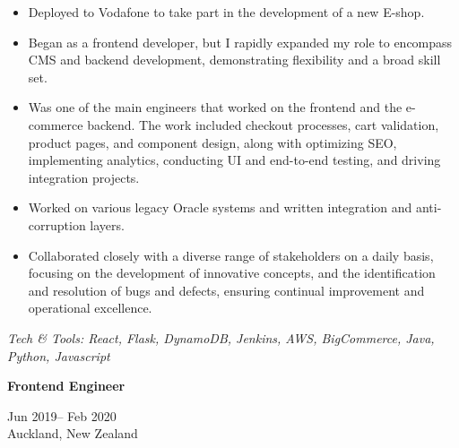 \documentclass[10pt,a4paper,ragged2e,withhyper]{altacv}
\renewcommand{\cvevent}[4]{%
  \textbf{#1} %
  \hfill %
  \begin{minipage}[t]{.5\linewidth}
    \raggedleft %
    \small#3 %
    \\ %
    #4 %
  \end{minipage}
  \vspace{\baselineskip} %
}
\begin{document}
\begin{itemize}
  \item Deployed to Vodafone to take part in the development of a new E-shop.
  \item Began as a frontend developer, but I rapidly expanded my role to encompass CMS and backend development, demonstrating flexibility and a broad skill set.
  \item Was one of the main engineers that worked on the frontend and the e-commerce backend. The work included checkout processes, cart validation, product pages, and component design, along with optimizing SEO, implementing analytics, conducting UI and end-to-end testing, and driving integration projects.
  \item Worked on various legacy Oracle systems and written integration and anti-corruption layers.
  \item Collaborated closely with a diverse range of stakeholders on a daily basis, focusing on the development of innovative concepts, and the identification and resolution of bugs and defects, ensuring continual improvement and operational excellence.
\end{itemize}




\vspace{0.5cm}

\textit{Tech \& Tools: React, Flask, DynamoDB, Jenkins, AWS, BigCommerce, Java, Python, Javascript}


\divider



\cvevent{Frontend Engineer}{Navigate Travel}{Jun 2019-- Feb 2020}{Auckland, New Zealand}
\end{document}
